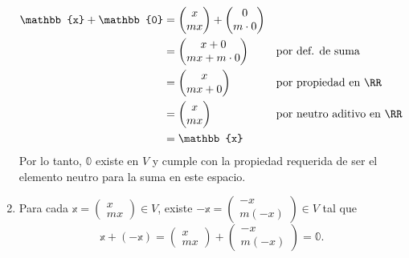 \begin{examplebox}{}{}
\begin{enumerate}[label=\roman*), topsep=6pt, itemsep=0pt]
        \begin{align*}
            \mathbb{x} + \mathbb{0} & = \begin{pmatrix}
                x \\
                mx
            \end{pmatrix} + \begin{pmatrix}
                0 \\
                m \cdot 0
            \end{pmatrix} \\
            & = \begin{pmatrix}
                x + 0 \\
                mx + m \cdot 0
            \end{pmatrix} && \text{por def. de suma} \\
            & = \begin{pmatrix}
                x \\
                mx + 0
            \end{pmatrix} && \text{por propiedad en $\RR$} \\
            & = \begin{pmatrix}
                x \\
                mx
            \end{pmatrix} && \text{por neutro aditivo en $\RR$} \\
            & = \mathbb{x}
        \end{align*}
        Por lo tanto, $\mathbb{0}$ existe en $V$ y cumple con la propiedad requerida de ser el elemento neutro para la suma en este espacio.
        \item Para cada $\mathbb{x} = \begin{pmatrix}
            x \\
            mx
        \end{pmatrix} \in V$, existe $-\mathbb{x} = \begin{pmatrix}
            -x \\
            m(-x)
        \end{pmatrix} \in V$ tal que
        $$\mathbb{x} + (-\mathbb{x}) = \begin{pmatrix}
            x \\
            mx
        \end{pmatrix} + \begin{pmatrix}
            -x \\
            m(-x)
        \end{pmatrix} = \mathbb{0}.$$

\end{enumerate}
\end{examplebox}
